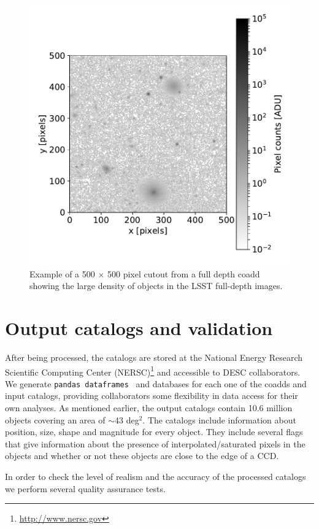 \documentclass[twocolumn]{aastex62}
\begin{document}
\begin{figure}
\centering
\includegraphics[width=0.9\columnwidth]{sample_coadd_DC1.pdf}
\caption{Example of a 500 $\times$ 500 pixel cutout from a full depth coadd showing the large density of objects in the LSST full-depth images.}
\label{fig:coadd_example}
\end{figure}

\section{Output catalogs and validation}
\label{sec:catalogs}

After being processed, the catalogs are stored at the National Energy Research Scientific Computing Center (NERSC)\footnote{\url{http://www.nersc.gov}} and accessible to DESC collaborators. We generate \texttt{pandas
dataframes}~\citep{mckinneypandas} and databases for each one of the coadds and input catalogs, providing collaborators some flexibility in data access for their own analyses. As mentioned earlier, the output catalogs contain 10.6 million objects covering an area
of $\sim$43 deg$^{2}$. The catalogs include information about position, size, shape and magnitude for every object. They include several flags that give information about the presence of interpolated/saturated pixels in the objects and whether or not these objects are close to the edge of a CCD.

In order to check the level of realism and the accuracy of the processed catalogs we perform several quality assurance tests.
\end{document}
